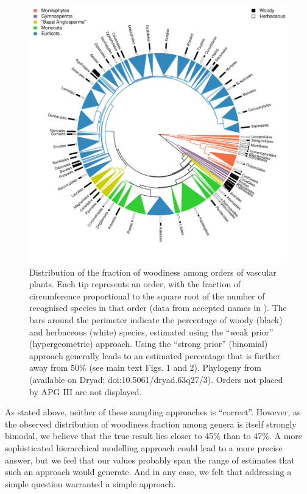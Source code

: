 \begin{figure}[p]
  \centering
  \includegraphics[width=\textwidth]{figs/fraction-on-phylogeny-supp}
  \caption[Distribution of the fraction of woodiness among orders of vascular
  plants II]{%
    Distribution of the fraction of woodiness among orders of vascular
    plants.  Each tip represents an order, with the fraction of
    circumference proportional to the square root of the number of
    recognised species in that order (data from accepted names in
    \citealt{theplantlist}).  The bars around the perimeter indicate the
    percentage of woody (black) and herbaceous (white) species,
    estimated using the ``weak prior'' (hypergeometric) approach.
    Using the ``strong prior'' (binomial) approach generally leads to
    an estimated percentage that is further away from 50\% (see
    main text Figs. 1 and 2).
    Phylogeny from \citet{Zanne} (available on Dryad;
    doi:10.5061/dryad.63q27/3). Orders not placed by APG III
    \citep{APG3} are not displayed.}
  \label{fig:phylogeny-supp}
\end{figure}

As stated above, neither of these sampling approaches is ``correct''. However,
as the observed distribution of woodiness fraction among genera is
itself strongly bimodal, we believe that the true result lies closer
to 45\% than to 47\%.  A more sophisticated hierarchical modelling
approach could lead to a more precise answer, but we feel that our
values probably span the range of estimates that such an approach
would generate. And in any case, we felt that addressing a simple question
warranted a simple approach.  

